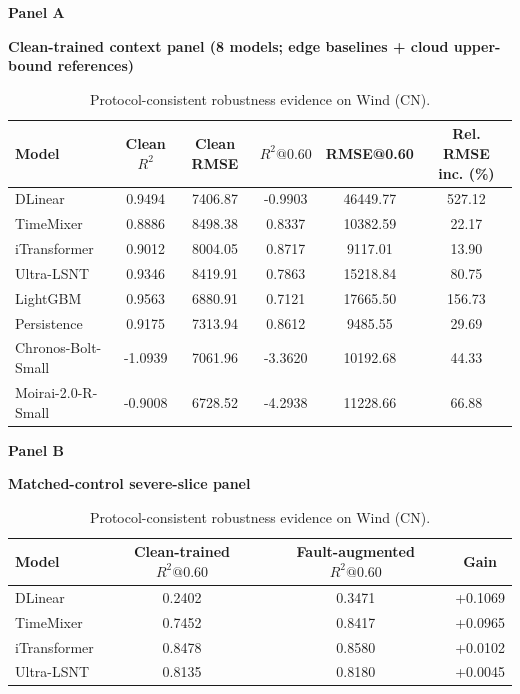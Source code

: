 \documentclass[review,1p,times]{elsarticle}
\newcommand{\aePanelHeading}[2]{%
  \par\vspace{2pt}%
  \noindent\begin{minipage}{\linewidth}
    \centering
    \textbf{#1}\par
    \textbf{#2}\par
  \end{minipage}%
  \par\vspace{2pt}%
}
\begin{document}
\begin{table}[t]
\centering
\caption{Protocol-consistent robustness evidence on Wind (CN).}
\label{tab:table2_comprehensive}
\label{tab:main4_perf_robust_transfer}
\label{tab:main_wind_cn}
\label{tab:master_robustness}
\footnotesize
\setlength{\tabcolsep}{4pt}
\aePanelHeading{Panel A}{Clean-trained context panel (8 models; edge baselines + cloud upper-bound references)}
\begin{tabular*}{\linewidth}{@{\extracolsep{\fill}}lccccc@{}}
\toprule
\textbf{Model} & \textbf{Clean $R^2$} & \textbf{Clean RMSE} & \textbf{$R^2@0.60$} & \textbf{RMSE@0.60} & \textbf{Rel. RMSE inc. (\%)} \\
\midrule
DLinear & 0.9494 & 7406.87 & -0.9903 & 46449.77 & 527.12 \\
TimeMixer & 0.8886 & 8498.38 & 0.8337 & 10382.59 & 22.17 \\
iTransformer & 0.9012 & 8004.05 & 0.8717 & 9117.01 & 13.90 \\
Ultra-LSNT & 0.9346 & 8419.91 & 0.7863 & 15218.84 & 80.75 \\
LightGBM & 0.9563 & 6880.91 & 0.7121 & 17665.50 & 156.73 \\
Persistence & 0.9175 & 7313.94 & 0.8612 & 9485.55 & 29.69 \\
Chronos-Bolt-Small & -1.0939 & 7061.96 & -3.3620 & 10192.68 & 44.33 \\
Moirai-2.0-R-Small & -0.9008 & 6728.52 & -4.2938 & 11228.66 & 66.88 \\
\bottomrule
\end{tabular*}
\vspace{4pt}
\aePanelHeading{Panel B}{Matched-control severe-slice panel}
\begin{tabular*}{0.92\linewidth}{@{\extracolsep{\fill}}lccc@{}}
\toprule
\textbf{Model} & \textbf{Clean-trained $R^2@0.60$} & \textbf{Fault-augmented $R^2@0.60$} & \textbf{Gain} \\
\midrule
DLinear & 0.2402 & 0.3471 & +0.1069 \\
TimeMixer & 0.7452 & 0.8417 & +0.0965 \\
iTransformer & 0.8478 & 0.8580 & +0.0102 \\
Ultra-LSNT & 0.8135 & 0.8180 & +0.0045 \\
\bottomrule
\end{tabular*}

\end{table}
\end{document}
